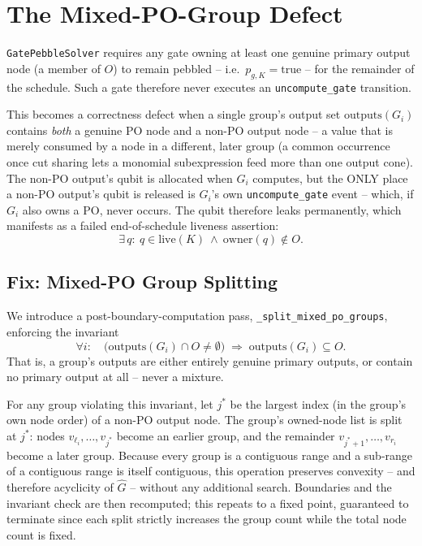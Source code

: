 \documentclass[conference]{IEEEtran}
\begin{document}
\section{The Mixed-PO-Group Defect}

\texttt{GatePebbleSolver} requires any gate owning at least one genuine
primary output node (a member of $O$) to remain pebbled -- i.e.\
$p_{g,K}=\mathrm{true}$ -- for the remainder of the schedule. Such a
gate therefore never executes an \texttt{uncompute\_gate} transition.

This becomes a correctness defect when a single group's output set
$\mathrm{outputs}(G_i)$ contains \emph{both} a genuine PO node and a
non-PO output node -- a value that is merely consumed by a node in a
different, later group (a common occurrence once cut sharing lets a
monomial subexpression feed more than one output cone). The non-PO
output's qubit is allocated when $G_i$ computes, but the ONLY place a
non-PO output's qubit is released is $G_i$'s own
\texttt{uncompute\_gate} event -- which, if $G_i$ also owns a PO, never
occurs. The qubit therefore leaks permanently, which manifests as a
failed end-of-schedule liveness assertion:
\begin{equation}
\exists\, q:\ q \in \mathrm{live}(K) \ \wedge\ \mathrm{owner}(q) \notin O.
\end{equation}

\subsection{Fix: Mixed-PO Group Splitting}

We introduce a post-boundary-computation pass,
\texttt{\_split\_mixed\_po\_groups}, enforcing the invariant
\begin{equation}
\forall i:\quad
\big(\mathrm{outputs}(G_i)\cap O \ne \emptyset\big)
\;\Rightarrow\;
\mathrm{outputs}(G_i)\subseteq O.
\end{equation}
That is, a group's outputs are either entirely genuine primary outputs,
or contain no primary output at all -- never a mixture.

For any group violating this invariant, let $j^\ast$ be the largest
index (in the group's own node order) of a non-PO output node. The
group's owned-node list is split at $j^\ast$: nodes
$v_{\ell_i},\dots,v_{j^\ast}$ become an earlier group, and the
remainder $v_{j^\ast+1},\dots,v_{r_i}$ become a later group. Because
every group is a contiguous range and a sub-range of a contiguous range
is itself contiguous, this operation preserves convexity -- and
therefore acyclicity of $\widehat G$ -- without any additional search.
Boundaries and the invariant check are then recomputed; this repeats to
a fixed point, guaranteed to terminate since each split strictly
increases the group count while the total node count is fixed.
\end{document}
